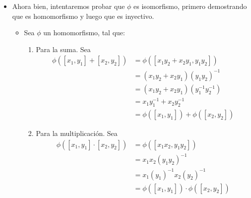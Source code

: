 \begin{problema}[Problema 4]
\begin{dem}
\begin{itemize}
\begin{itemize}
                \end{itemize}
                \item Ahora bien, intentaremos probar que $\phi$ es isomorfismo, primero demostrando que es homomorfismo y luego que es inyectivo. 
                    \begin{itemize}
                        \item Sea $\phi$ un homomorfismo, tal que: 
                        \begin{enumerate}
                            \item Para la suma. Sea 
                            \begin{align*}
                                \phi([x_1,y_1]+[x_2,y_2]) &= \phi([x_1y_2+x_2y_1,y_1y_2])\\
                                &= (x_1y_2+x_2y_1)(y_1y_2)^{-1}\\
                                &= (x_1y_2+x_2y_1)(y_1^{-1}y_2^{-1})\\
                                &= x_1y_1^{-1} +x_2y_2^{-1}\\
                                &= \phi([x_1,y_1])+\phi([x_2,y_2])
                            \end{align*}
                            \item Para la multiplicación. Sea 
                            \begin{align*}
                                \phi([x_1,y_1]\cdot[x_2,y_2]) &= \phi([x_1x_2,y_1y_2])\\
                                &= x_1x_2(y_1y_2)^{-1}\\
                                &= x_1(y_1)^{-1}x_2(y_2)^{-1}\\
                                &= \phi([x_1,y_1])\cdot\phi([x_2,y_2])
                            \end{align*} 
                            

\end{enumerate}
\end{itemize}
\end{itemize}
\end{dem}
\end{problema}
